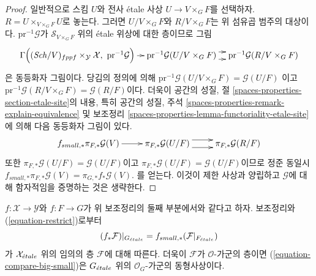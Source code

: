 \begin{proof}
\medskip\noindent
일반적으로 스킴 $U$와 전사 \'etale 사상
$U \to V \times_G F$를 선택하자. $R = U \times_{V \times_G F} U$로
놓는다. 그러면 $U/V \times_G F$와 $R/V \times_G F$는 위 섬유곱
범주의 대상이다. $\text{pr}^{-1}\mathcal{G}$가
$\mathcal{S}_{V \times_G F}$ 위의 \'etale 위상에 대한 층이므로 그림
$$
\xymatrix@C=0.8em{
\Gamma\Big(
(\Sch/V)_{fppf} \times_{\mathcal{Y}} \mathcal{X},
\ \text{pr}^{-1}\mathcal{G}\Big)
\ar[r] &
\text{pr}^{-1}\mathcal{G}(U/V \times_G F) \ar@<1ex>[r] \ar@<-1ex>[r] &
\text{pr}^{-1}\mathcal{G}(R/V \times_G F)
}
$$
은 동등화자 그림이다. 당김의 정의에 의해
$\text{pr}^{-1}\mathcal{G}(U/V \times_G F) = \mathcal{G}(U/F)$
이고 $\text{pr}^{-1}\mathcal{G}(R/V \times_G F) = \mathcal{G}(R/F)$이다.
더욱이 공간의 성질, 절
\ref{spaces-properties-section-etale-site}의 내용, 특히 공간의 성질,
주석 \ref{spaces-properties-remark-explain-equivalence} 및 보조정리
\ref{spaces-properties-lemma-functoriality-etale-site}에 의해
다음 동등화자 그림이 있다.
$$
\xymatrix{
f_{small, *}\pi_{F, *}\mathcal{G}(V)
\ar[r] &
\pi_{F, *}\mathcal{G}(U/F) \ar@<1ex>[r] \ar@<-1ex>[r] &
\pi_{F, *}\mathcal{G}(R/F)
}
$$
또한 $\pi_{F, *}\mathcal{G}(U/F) = \mathcal{G}(U/F)$이고
$\pi_{F, *}\mathcal{G}(U/F) = \mathcal{G}(U/F)$이므로 정준 동일시
$f_{small, *}\pi_{F, *}\mathcal{G}(V) = \pi_{G, *}f_*\mathcal{G}(V)$.
를 얻는다. 이것이 제한 사상과 양립하고 $\mathcal{G}$에 대해
함자적임을 증명하는 것은 생략한다.
\end{proof}

\noindent
$f : \mathcal{X} \to \mathcal{Y}$와 $f : F \to G$가 위 보조정리의
둘째 부분에서와 같다고 하자. 보조정리와
(\ref{equation-restrict})로부터
\begin{equation}
\label{equation-compare-big-small}
(f_*\mathcal{F})|_{G_{\acute{e}tale}} =
f_{small, *}(\mathcal{F}|_{F_{\acute{e}tale}})
\end{equation}
가 $\mathcal{X}_{\acute{e}tale}$ 위의 임의의 층 $\mathcal{F}$에 대해 따른다.
더욱이 $\mathcal{F}$가 $\mathcal{O}$-가군의 층이면
(\ref{equation-compare-big-small})은 $G_{\acute{e}tale}$ 위의
$\mathcal{O}_G$-가군의 동형사상이다.

